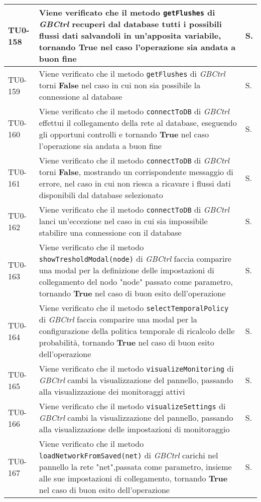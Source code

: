 \begin{longtable}{|C{.15\textwidth}|m{.66\textwidth}|C{.10\textwidth}|}
\hline
TU0-158 & Viene verificato che il metodo \texttt{getFlushes} di \textit{GBCtrl} recuperi dal database tutti i possibili flussi dati salvandoli in un'apposita variabile, tornando \textbf{True} nel caso l'operazione sia andata a buon fine & S.\\
\hline
{}TU0-159 & Viene verificato che il metodo \texttt{getFlushes} di \textit{GBCtrl} torni \textbf{False} nel caso in cui non sia possibile la connessione al database & S.\\
\hline
TU0-160 & Viene verificato che il metodo \texttt{connectToDB} di \textit{GBCtrl} effettui il collegamento della rete al database, eseguendo gli opportuni controlli e tornando \textbf{True} nel caso l'operazione sia andata a buon fine & S.\\
\hline
{}TU0-161 & Viene verificato che il metodo \texttt{connectToDB} di \textit{GBCtrl} torni \textbf{False}, mostrando un corrispondente messaggio di errore, nel caso in cui non riesca a ricavare i flussi dati disponibili dal database selezionato & S.\\
\hline
TU0-162 & Viene verificato che il metodo \texttt{connectToDB} di \textit{GBCtrl} lanci un'eccezione nel caso in cui sia impossibile stabilire una connessione con il database & S.\\
\hline
{}TU0-163 & Viene verificato che il metodo \texttt{showTresholdModal(node)} di \textit{GBCtrl} faccia comparire una modal per la definizione delle impostazioni di collegamento del nodo "node" passato come parametro, tornando \textbf{True} nel caso di buon esito dell'operazione & S.\\
\hline
TU0-164 & Viene verificato che il metodo \texttt{selectTemporalPolicy} di \textit{GBCtrl} faccia comparire una modal per la configurazione della politica temporale di ricalcolo delle probabilità, tornando \textbf{True} nel caso di buon esito dell'operazione & S.\\
\hline
{}TU0-165 & Viene verificato che il metodo \texttt{visualizeMonitoring} di \textit{GBCtrl} cambi la visualizzazione del pannello, passando alla visualizzazione dei monitoraggi attivi & S.\\
\hline
TU0-166 & Viene verificato che il metodo \texttt{visualizeSettings} di \textit{GBCtrl} cambi la visualizzazione del pannello, passando alla visualizzazione delle impostazioni di monitoraggio & S.\\
\hline
{}TU0-167 & Viene verificato che il metodo \texttt{loadNetworkFromSaved(net)} di \textit{GBCtrl} carichi nel pannello la rete "net",passata come parametro, insieme alle sue impostazioni di collegamento, tornando \textbf{True} nel caso di buon esito dell'operazione & S.\\

\end{longtable}
